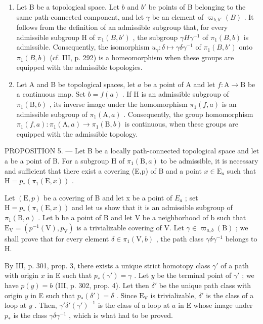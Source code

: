 \begin{enumerate}
\def\labelenumi{\arabic{enumi})}
\setcounter{enumi}{1}
\item
  Let B be a topological space. Let \(b\) and \(b'\) be points of B belonging to the same path-connected component, and let \(\gamma\) be an element of \(\varpi_{b,b'}(B)\) . It follows from the definition of an admissible subgroup that, for every admissible subgroup H of \(\pi_1(B,b')\) , the subgroup \(\gamma H\gamma^{-1}\) of \(\pi_1(B,b)\) is admissible. Consequently, the isomorphism \(u_\gamma \colon \delta \mapsto \gamma \delta \gamma^{-1}\) of \(\pi_1(B,b')\) onto \(\pi_1(B,b)\) (cf. III, p. 292) is a homeomorphism when these groups are equipped with the admissible topologies.
\item
  Let A and B be topological spaces, let \(a\) be a point of A and let \(f\colon\mathrm{A}\to\mathrm{B}\) be a continuous map. Set \(b=f(a)\) . If H is an admissible subgroup of \(\pi_{1}(\mathrm{B},b)\) , its inverse image under the homomorphism \(\pi_{1}(f,a)\) is an admissible subgroup of \(\pi_{1}(\mathrm{A},a)\) . Consequently, the group homomorphism \(\pi_{1}(f,a)\colon\pi_{1}(\mathrm{A},a)\to\pi_{1}(\mathrm{B},b)\) is continuous, when these groups are equipped with the admissible topology.
\end{enumerate}

PROPOSITION 5. --- Let B be a locally path-connected topological space and let a be a point of B. For a subgroup H of \(\pi_1(\mathrm{B},a)\) to be admissible, it is necessary and sufficient that there exist a covering (E,p) of B and a point \(x\in \mathrm{E}_a\) such that \(\mathrm{H} = p_{*}(\pi_{1}(\mathrm{E},x))\) .

Let \((\mathrm{E},p)\) be a covering of B and let x be a point of \(E_{a}\) ; set \(\mathrm{H}=p_{*}(\pi_{1}(\mathrm{E},x))\) and let us show that it is an admissible subgroup of \(\pi_{1}(\mathrm{B},a)\) . Let b be a point of B and let V be a neighborhood of b such that \(\mathrm{E}_{\mathrm{V}}=(p^{-1}(\mathrm{V}),p_{\mathrm{V}})\) is a trivializable covering of V. Let \(\gamma\in\varpi_{a,b}(\mathrm{B})\) ; we shall prove that for every element \(\delta\in\pi_{1}(\mathrm{V},b)\) , the path class \(\gamma\delta\gamma^{-1}\) belongs to H.

By III, p. 301, prop. 3, there exists a unique strict homotopy class \(\gamma'\) of a path with origin \(x\) in E such that \(p_*(\gamma') = \gamma\) . Let \(y\) be the terminal point of \(\gamma'\) ; we have \(p(y) = b\) (III, p. 302, prop. 4). Let then \(\delta'\) be the unique path class with origin \(y\) in E such that \(p_*(\delta') = \delta\) . Since \(\mathrm{E_V}\) is trivializable, \(\delta'\) is the class of a loop at \(y\) . Then, \(\gamma'\delta'(\gamma')^{-1}\) is the class of a loop at \(a\) in E whose image under \(p_*\) is the class \(\gamma\delta\gamma^{-1}\) , which is what had to be proved.

